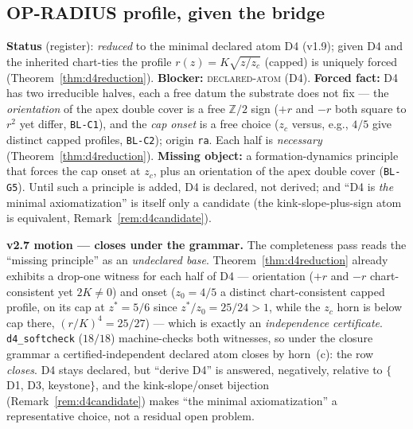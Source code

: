 \documentclass[11pt]{article}
\newcommand{\hx}[1]{\textcolor{cC}{\footnotesize\texttt{#1}}}
\newcommand{\Z}{\mathbb{Z}}
\theoremstyle{plain}
\theoremstyle{definition}
\theoremstyle{remark}
\begin{document}
\subsection{OP-RADIUS profile, given the bridge}\label{blk:radprof}
\textbf{Status} (register): \emph{reduced} to the minimal declared atom D4 (v1.9);
given D4 and the inherited chart-ties the profile $r(z)=K\sqrt{z/z_c}$ (capped) is
uniquely forced (Theorem~\ref{thm:d4reduction}). \textbf{Blocker:}
\textsc{declared-atom} (D4). \textbf{Forced fact:} D4 has two irreducible halves,
each a free datum the substrate does not fix --- the \emph{orientation} of the
apex double cover is a free $\Z/2$ sign ($+r$ and $-r$ both square to $r^2$ yet
differ, \hx{BL-C1}), and the \emph{cap onset} is a free choice ($z_c$ versus,
e.g., $4/5$ give distinct capped profiles, \hx{BL-C2}); origin \texttt{ra}. Each
half is \emph{necessary} (Theorem~\ref{thm:d4reduction}). \textbf{Missing
object:} a formation-dynamics principle that forces the cap onset at $z_c$, plus
an orientation of the apex double cover (\hx{BL-G5}). Until such a principle is
added, D4 is declared, not derived; and ``D4 is \emph{the} minimal
axiomatization'' is itself only a candidate (the kink-slope-plus-sign atom is
equivalent, Remark~\ref{rem:d4candidate}).

\smallskip\noindent
\textbf{v2.7 motion --- closes under the grammar.} The completeness pass reads the
``missing principle'' as an \emph{undeclared base}. Theorem~\ref{thm:d4reduction}
already exhibits a drop-one witness for each half of D4 --- orientation ($+r$ and
$-r$ chart-consistent yet $2K\ne0$) and onset ($z_0=4/5$ a distinct chart-consistent
capped profile, on its cap at $z^\ast=5/6$ since $z^\ast/z_0=25/24>1$, while the
$z_c$ horn is below cap there, $(r/K)^4=25/27$) --- which is exactly an
\emph{independence certificate}. \texttt{d4\_softcheck} ($18/18$) machine-checks both
witnesses, so under the closure grammar a certified-independent declared atom closes
by horn~(c): the row \emph{closes}. D4 stays declared, but ``derive D4'' is answered,
negatively, relative to $\{$D1, D3, keystone$\}$, and the kink-slope/onset bijection
(Remark~\ref{rem:d4candidate}) makes ``the minimal axiomatization'' a representative
choice, not a residual open problem.
\end{document}
